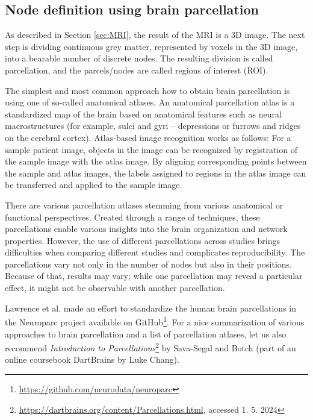 \subsection{Node definition using brain parcellation}

As described in Section \ref{sec:MRI}, the result of the MRI is a 3D image. The next step is dividing continuous grey matter, represented by voxels in the 3D image, into a bearable number of discrete nodes. The resulting division is called parcellation, and the parcels/nodes are called regions of interest (ROI). 

The simplest and most common approach how to obtain brain parcellation is using one of so-called anatomical atlases. An anatomical parcellation atlas is a standardized map of the brain based on anatomical features such as neural macrostructures (for example, sulci and gyri -- depressions or furrows and ridges on the cerebral cortex). Atlas-based image recognition works as follows: For a sample patient image, objects in the image can be recognized by registration of the sample image with the atlas image. By aligning corresponding points between the sample and atlas images, the labels assigned to regions in the atlas image can be transferred and applied to the sample image. \cite{sotiropoulos_building_2019, lawrence_standardizing_2021,chang_ljchangdartbrains_2020,rohrer_focused_2008} 

There are various parcellation atlases stemming from various anatomical or functional perspectives. Created through a range of techniques, these parcellations enable various insights into the brain organization and network properties. However, the use of different parcellations across studies brings difficulties when comparing different studies and complicates reproducibility. The parcellations vary not only in the number of nodes but also in their positions. Because of that, results may vary; while one parcellation may reveal a particular effect, it might not be observable with another parcellation.  \cite{sotiropoulos_building_2019, lawrence_standardizing_2021}

Lawrence et al. made an effort to standardize the human brain parcellations in the Neuroparc project available on GitHub\footnote{\url{https://github.com/neurodata/neuroparc}}. For a nice summarization of various approaches to brain parcellation and a list of parcellation atlases, let us also recommend \textit{Introduction to Parcellations}\footnote{\url{https://dartbrains.org/content/Parcellations.html}, accessed 1. 5. 2024} by Sava-Segal and Botch (part of an online coursebook DartBrains by Luke Chang). \cite{chang_ljchangdartbrains_2020}

